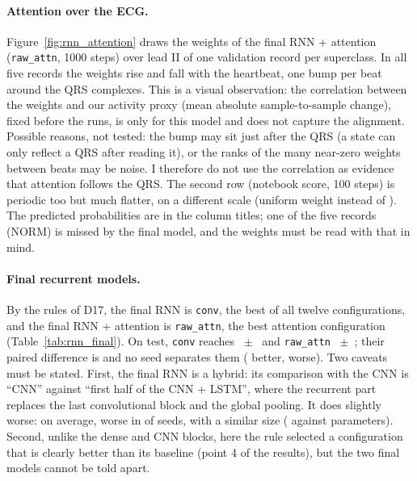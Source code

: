 \paragraph{Attention over the ECG.} Figure~\ref{fig:rnn_attention} draws the weights of the final RNN +
attention (\texttt{raw\_attn}, 1000 steps) over lead II of one validation record per superclass. In all
five records the weights rise and fall with the heartbeat, one bump per beat around the QRS complexes.
This is a visual observation: the correlation between the weights and our activity proxy (mean absolute
sample-to-sample change), fixed before the runs, is only \rnnAttnSpearmanActivityRawAttn{} for this model
and does not capture the alignment. Possible reasons, not tested: the bump may sit just after the QRS (a
state can only reflect a QRS after reading it), or the ranks of the many near-zero weights between beats
may be noise. I therefore do not use the correlation as evidence that attention follows the QRS. The
second row (notebook score, 100 steps) is periodic too but much flatter, on a different scale (uniform
weight \rnnAttnUniformAttnTanh{} instead of \rnnAttnUniformRawAttn{}). The predicted probabilities are in
the column titles; one of the five records (NORM) is missed by the final model, and the weights must be
read with that in mind.

\paragraph{Final recurrent models.} By the rules of D17, the final RNN is \texttt{conv}, the best of all
twelve configurations, and the final RNN + attention is \texttt{raw\_attn}, the best attention
configuration (Table~\ref{tab:rnn_final}). On test, \texttt{conv} reaches
\rnnFinalTestMacroAurocMean{}~$\pm$~\rnnFinalTestMacroAurocSd{} and \texttt{raw\_attn}
\rnnAttnfinalTestMacroAurocMean{}~$\pm$~\rnnAttnfinalTestMacroAurocSd{}; their paired difference is
\rnnDiffAttnFinalMean{} and no seed separates them (\rnnNSeedsBetterAttnFinal{} better,
\rnnNSeedsWorseAttnFinal{} worse). Two caveats must be stated. First, the final RNN is a hybrid: its
comparison with the CNN is ``CNN'' against ``first half of the CNN + LSTM'', where the recurrent part
replaces the last convolutional block and the global pooling. It does slightly worse: \rnnDiffCnnMean{}
on average, worse in \rnnNSeedsWorseCnn{} of \rnnNSeedsComparedCnn{} seeds, with a similar size
(\rnnFinalNParams{} against \cnnFinalNParams{} parameters). Second, unlike the dense and CNN blocks, here
the rule selected a configuration that is clearly better than its baseline (point 4 of the results), but
the two final models cannot be told apart.


